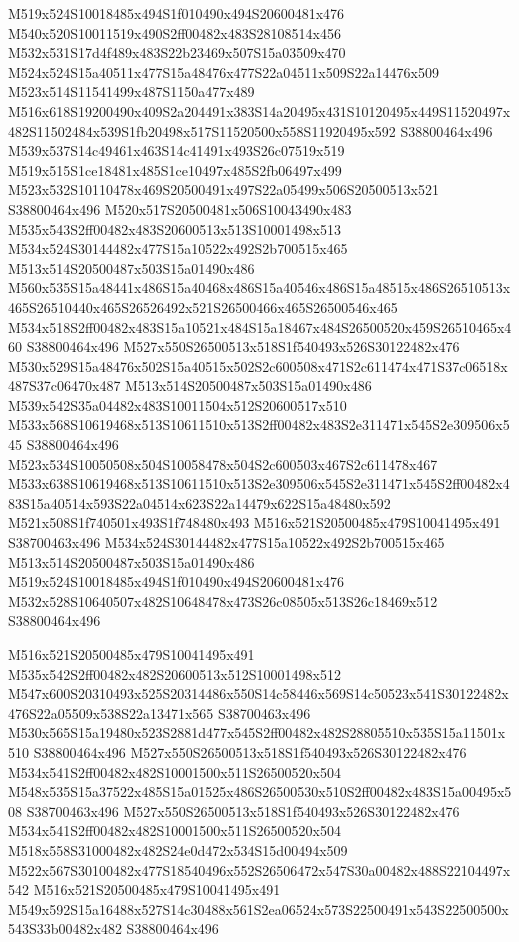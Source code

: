 \documentclass{article}
\begin{document}
\begin{multicols}{2}
M519x524S10018485x494S1f010490x494S20600481x476 M540x520S10011519x490S2ff00482x483S28108514x456 M532x531S17d4f489x483S22b23469x507S15a03509x470 M524x524S15a40511x477S15a48476x477S22a04511x509S22a14476x509 M523x514S11541499x487S1150a477x489 M516x618S19200490x409S2a204491x383S14a20495x431S10120495x449S11520497x482S11502484x539S1fb20498x517S11520500x558S11920495x592 S38800464x496 M539x537S14c49461x463S14c41491x493S26c07519x519 M519x515S1ce18481x485S1ce10497x485S2fb06497x499 M523x532S10110478x469S20500491x497S22a05499x506S20500513x521 S38800464x496 M520x517S20500481x506S10043490x483 M535x543S2ff00482x483S20600513x513S10001498x513 M534x524S30144482x477S15a10522x492S2b700515x465 M513x514S20500487x503S15a01490x486 M560x535S15a48441x486S15a40468x486S15a40546x486S15a48515x486S26510513x465S26510440x465S26526492x521S26500466x465S26500546x465 M534x518S2ff00482x483S15a10521x484S15a18467x484S26500520x459S26510465x460 S38800464x496 M527x550S26500513x518S1f540493x526S30122482x476 M530x529S15a48476x502S15a40515x502S2c600508x471S2c611474x471S37c06518x487S37c06470x487 M513x514S20500487x503S15a01490x486 M539x542S35a04482x483S10011504x512S20600517x510 M533x568S10619468x513S10611510x513S2ff00482x483S2e311471x545S2e309506x545 S38800464x496 M523x534S10050508x504S10058478x504S2c600503x467S2c611478x467 M533x638S10619468x513S10611510x513S2e309506x545S2e311471x545S2ff00482x483S15a40514x593S22a04514x623S22a14479x622S15a48480x592 M521x508S1f740501x493S1f748480x493 M516x521S20500485x479S10041495x491 S38700463x496 M534x524S30144482x477S15a10522x492S2b700515x465 M513x514S20500487x503S15a01490x486 M519x524S10018485x494S1f010490x494S20600481x476 M532x528S10640507x482S10648478x473S26c08505x513S26c18469x512 S38800464x496

M516x521S20500485x479S10041495x491 M535x542S2ff00482x482S20600513x512S10001498x512 M547x600S20310493x525S20314486x550S14c58446x569S14c50523x541S30122482x476S22a05509x538S22a13471x565 S38700463x496 M530x565S15a19480x523S2881d477x545S2ff00482x482S28805510x535S15a11501x510 S38800464x496 M527x550S26500513x518S1f540493x526S30122482x476 M534x541S2ff00482x482S10001500x511S26500520x504 M548x535S15a37522x485S15a01525x486S26500530x510S2ff00482x483S15a00495x508 S38700463x496 M527x550S26500513x518S1f540493x526S30122482x476 M534x541S2ff00482x482S10001500x511S26500520x504 M518x558S31000482x482S24e0d472x534S15d00494x509 M522x567S30100482x477S18540496x552S26506472x547S30a00482x488S22104497x542 M516x521S20500485x479S10041495x491 M549x592S15a16488x527S14c30488x561S2ea06524x573S22500491x543S22500500x543S33b00482x482 S38800464x496


\end{multicols}
\end{document}
